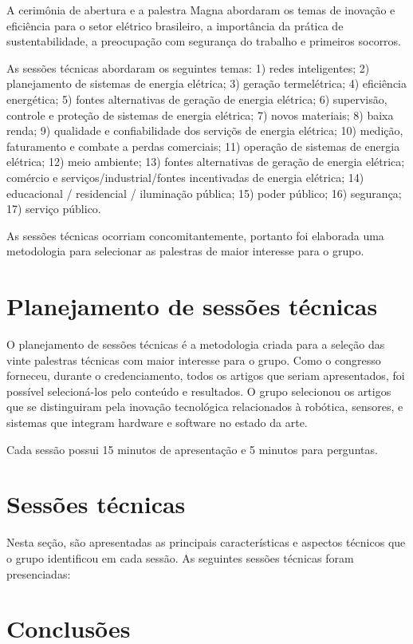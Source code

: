 \documentclass[12pt,a4paper]{article}
\begin{document}
A cerimônia de abertura e a palestra Magna abordaram os temas de inovação e
eficiência para o setor elétrico brasileiro, a importância da prática de
sustentabilidade, a preocupação com segurança do trabalho e primeiros socorros.

As sessões técnicas abordaram os seguintes temas: 1) redes inteligentes; 2)
planejamento de sistemas de energia elétrica; 3) geração termelétrica; 4)
eficiência energética; 5) fontes alternativas de geração de energia elétrica; 6)
supervisão, controle e proteção de sistemas de energia elétrica; 7) novos
materiais; 8) baixa renda; 9) qualidade e confiabilidade dos serviçõs de energia
elétrica; 10) medição, faturamento e combate a perdas comerciais; 11) operação
de sistemas de energia elétrica; 12) meio ambiente; 13) fontes alternativas de
geração de energia elétrica; comércio e serviços/industrial/fontes incentivadas
de energia elétrica; 14) educacional / residencial / iluminação pública; 15)
poder público; 16) segurança; 17) serviço público.

As sessões técnicas ocorriam concomitantemente, portanto foi elaborada uma
metodologia para selecionar as palestras de maior interesse para o grupo. 

\section{Planejamento de sessões técnicas}
O planejamento de sessões técnicas é a metodologia criada para a seleção das
vinte palestras técnicas com maior interesse para o grupo. Como o congresso
forneceu, durante o credenciamento, todos os artigos que seriam apresentados,
foi possível selecioná-los pelo conteúdo e resultados. O grupo selecionou os
artigos que se distinguiram pela inovação tecnológica relacionados à robótica,
sensores, e sistemas que integram hardware e software no estado da arte.

Cada sessão possui 15 minutos de apresentação e 5 minutos para perguntas.

\section{Sessões técnicas}
Nesta seção, são apresentadas as principais características e aspectos técnicos
que o grupo identificou em cada sessão. As seguintes sessões técnicas foram
presenciadas:







\section{Conclusões}


\end{document}
